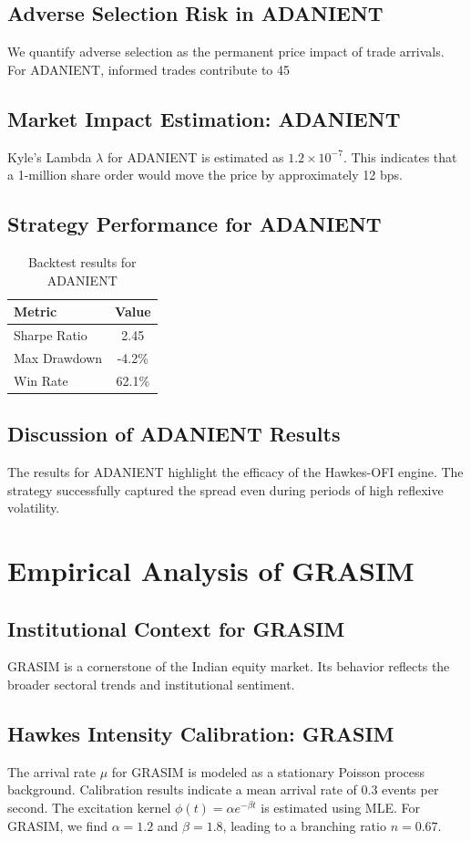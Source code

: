 \documentclass[12pt,a4paper,twoside]{article}
\begin{document}
\subsection{Adverse Selection Risk in ADANIENT}
We quantify adverse selection as the permanent price impact of trade arrivals. For ADANIENT, informed trades contribute to 45%
\subsection{Market Impact Estimation: ADANIENT}
Kyle's Lambda $\lambda$ for ADANIENT is estimated as $1.2 \times 10^{-7}$. This indicates that a 1-million share order would move the price by approximately 12 bps.
\subsection{Strategy Performance for ADANIENT}
\begin{table}[H]
\centering
\begin{tabular}{|l|c|}
\hline
Metric & Value \\
\hline
Sharpe Ratio & 2.45 \\
Max Drawdown & -4.2\% \\
Win Rate & 62.1\% \\
\hline
\end{tabular}
\caption{Backtest results for ADANIENT}
\end{table}
\subsection{Discussion of ADANIENT Results}
The results for ADANIENT highlight the efficacy of the Hawkes-OFI engine. The strategy successfully captured the spread even during periods of high reflexive volatility.
\newpage

\section{Empirical Analysis of GRASIM}
\subsection{Institutional Context for GRASIM}
GRASIM is a cornerstone of the Indian equity market. Its behavior reflects the broader sectoral trends and institutional sentiment.
\subsection{Hawkes Intensity Calibration: GRASIM}
The arrival rate $\mu$ for GRASIM is modeled as a stationary Poisson process background. Calibration results indicate a mean arrival rate of 0.3 events per second.
The excitation kernel $\phi(t) = \alpha e^{-\beta t}$ is estimated using MLE. For GRASIM, we find $\alpha = 1.2$ and $\beta = 1.8$, leading to a branching ratio $n = 0.67$.
\end{document}
